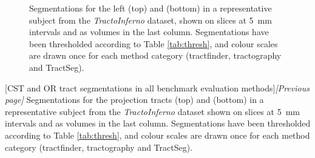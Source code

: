 \documentclass[12pt,phd,a4paper,twoside]{ucl_thesis}
\providecommand{\DIFaddbegin}{} %
\providecommand{\DIFaddend}{} %
\providecommand{\DIFdelbegin}{} %
\providecommand{\DIFdelend}{} %
\newcommand{\DIFscaledelfig}{0.5}
\newlength{\DIFdelgraphicswidth} %
\newlength{\DIFdelgraphicsheight} %
\newcommand{\DIFaddincludegraphics}[2][]{{\color{blue}\fbox{\DIFOincludegraphics[#1]{#2}}}} %
\newcommand{\DIFdelincludegraphics}[2][]{%
\sbox{\DIFdelgraphicsbox}{\DIFOincludegraphics[#1]{#2}}%
\settoboxwidth{\DIFdelgraphicswidth}{\DIFdelgraphicsbox} %
\settoboxtotalheight{\DIFdelgraphicsheight}{\DIFdelgraphicsbox} %
\scalebox{\DIFscaledelfig}{%
\parbox[b]{\DIFdelgraphicswidth}{\usebox{\DIFdelgraphicsbox}\\[-\baselineskip] \rule{\DIFdelgraphicswidth}{0em}}\llap{\resizebox{\DIFdelgraphicswidth}{\DIFdelgraphicsheight}{%
\setlength{\unitlength}{\DIFdelgraphicswidth}%
\begin{picture}(1,1)%
\thicklines\linethickness{2pt} %
{\color[rgb]{1,0,0}\put(0,0){\framebox(1,1){}}}%
{\color[rgb]{1,0,0}\put(0,0){\line( 1,1){1}}}%
{\color[rgb]{1,0,0}\put(0,1){\line(1,-1){1}}}%
\end{picture}%
}\hspace*{3pt}}} %
} %
\DeclareRobustCommand{\DIFaddbegin}{\DIFOaddbegin \let\includegraphics\DIFaddincludegraphics} %
\DeclareRobustCommand{\DIFaddend}{\DIFOaddend \let\includegraphics\DIFOincludegraphics} %
\DeclareRobustCommand{\DIFdelbegin}{\DIFOdelbegin \let\includegraphics\DIFdelincludegraphics} %
\DeclareRobustCommand{\DIFdelend}{\DIFOaddend \let\includegraphics\DIFOincludegraphics} %
\begin{document}
\begin{figure}[hp!]
  \begin{subfigure}{\textwidth}
    \makebox[\linewidth][r]{}
  \end{subfigure}
  \begin{subfigure}{\textwidth}
    \makebox[\linewidth][r]{}
  \end{subfigure}
  \caption[AF and IFOF tract segmentations in all benchmark evaluation methods]{Segmentations for the left  (top) and  (bottom) in a representative subject from the \textit{TractoInferno} dataset, shown on slices at 5~mm intervals and as volumes in the last column. Segmentations have been thresholded according to Table \ref{tab:thresh}, and colour scales are drawn once for each method category (tractfinder, tractography and TractSeg).}
  \label{fig:lb.afifof}
\end{figure}
\begin{figure}[htb!]
  \centering
  \begin{subfigure}{\textwidth}
    \makebox[\linewidth][r]{}
  \end{subfigure}
  \begin{subfigure}{\textwidth}
    \makebox[\linewidth][r]{}
  \end{subfigure}
\end{figure}
\clearpage\addtocounter{figure}{-1} {\DIFdelbegin %
\DIFdelend \DIFaddbegin {}[CST and OR tract segmentations in all benchmark evaluation methods]{\textit{[Previous page]} Segmentations for the projection tracts  (top) and  (bottom) in a representative subject from the \textit{TractoInferno} dataset shown on slices at 5~mm intervals and as volumes in the last column. Segmentations have been thresholded according to Table \ref{tab:thresh}, and colour scales are drawn once for each method category (tractfinder, tractography and TractSeg). \label{fig:lb.cstor}}
\DIFaddend }
\end{document}
